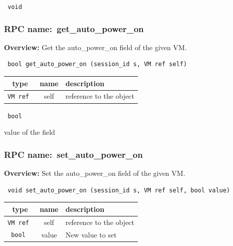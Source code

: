 \vspace{0.3cm}

{\tt 
void
}



\vspace{0.3cm}
\vspace{0.3cm}
\vspace{0.3cm}
\subsubsection{RPC name:~get\_auto\_power\_on}

{\bf Overview:} 
Get the auto\_power\_on field of the given VM.

\begin{verbatim} bool get_auto_power_on (session_id s, VM ref self)\end{verbatim}



 
\vspace{0.3cm}
\begin{tabular}{|c|c|p{7cm}|}
 \hline
{\bf type} & {\bf name} & {\bf description} \\ \hline
{\tt VM ref } & self & reference to the object \\ \hline 

\end{tabular}

\vspace{0.3cm}

{\tt 
bool
}


value of the field
\vspace{0.3cm}
\vspace{0.3cm}
\vspace{0.3cm}
\subsubsection{RPC name:~set\_auto\_power\_on}

{\bf Overview:} 
Set the auto\_power\_on field of the given VM.

\begin{verbatim} void set_auto_power_on (session_id s, VM ref self, bool value)\end{verbatim}



 
\vspace{0.3cm}
\begin{tabular}{|c|c|p{7cm}|}
 \hline
{\bf type} & {\bf name} & {\bf description} \\ \hline
{\tt VM ref } & self & reference to the object \\ \hline 

{\tt bool } & value & New value to set \\ \hline 

\end{tabular}

